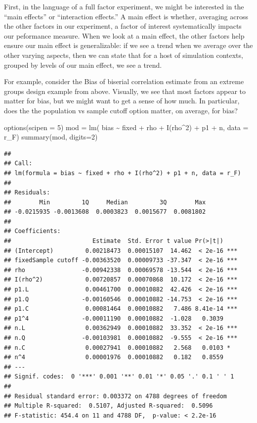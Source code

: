\documentclass[
]{book}
\newenvironment{Shaded}{\begin{snugshade}}{\end{snugshade}}
\newcommand{\AttributeTok}[1]{\textcolor[rgb]{0.77,0.63,0.00}{#1}}
\newcommand{\DecValTok}[1]{\textcolor[rgb]{0.00,0.00,0.81}{#1}}
\newcommand{\FunctionTok}[1]{\textcolor[rgb]{0.00,0.00,0.00}{#1}}
\newcommand{\NormalTok}[1]{#1}
\newcommand{\OtherTok}[1]{\textcolor[rgb]{0.56,0.35,0.01}{#1}}
\newcommand{\SpecialCharTok}[1]{\textcolor[rgb]{0.00,0.00,0.00}{#1}}
\begin{document}
First, in the language of a full factor experiment, we might be interested in the ``main effects'' or ``interaction effects.''
A main effect is whether, averaging across the other factors in our experiment, a factor of interest systematically impacts our peformance measure.
When we look at a main effect, the other factors help ensure our main effect is generalizable: if we see a trend when we average over the other varying aspects, then we can state that for a host of simulation contexts, grouped by levels of our main effect, we see a trend.

For example, consider the Bias of biserial correlation estimate from an extreme groups design example from above.
Visually, we see that most factors appear to matter for bias, but we might want to get a sense of how much.
In particular, does the the population vs sample cutoff option matter, on average, for bias?

\begin{Shaded}
\begin{Highlighting}[]
\FunctionTok{options}\NormalTok{(}\AttributeTok{scipen =} \DecValTok{5}\NormalTok{)}
\NormalTok{mod }\OtherTok{=} \FunctionTok{lm}\NormalTok{( bias }\SpecialCharTok{\textasciitilde{}}\NormalTok{ fixed }\SpecialCharTok{+}\NormalTok{ rho }\SpecialCharTok{+} \FunctionTok{I}\NormalTok{(rho}\SpecialCharTok{\^{}}\DecValTok{2}\NormalTok{) }\SpecialCharTok{+}\NormalTok{ p1 }\SpecialCharTok{+}\NormalTok{ n, }\AttributeTok{data =}\NormalTok{ r\_F)}
\FunctionTok{summary}\NormalTok{(mod, }\AttributeTok{digits=}\DecValTok{2}\NormalTok{)}
\end{Highlighting}
\end{Shaded}

\begin{verbatim}
## 
## Call:
## lm(formula = bias ~ fixed + rho + I(rho^2) + p1 + n, data = r_F)
## 
## Residuals:
##        Min         1Q     Median         3Q        Max 
## -0.0215935 -0.0013608  0.0003823  0.0015677  0.0081802 
## 
## Coefficients:
##                       Estimate  Std. Error t value Pr(>|t|)    
## (Intercept)         0.00218473  0.00015107  14.462  < 2e-16 ***
## fixedSample cutoff -0.00363520  0.00009733 -37.347  < 2e-16 ***
## rho                -0.00942338  0.00069578 -13.544  < 2e-16 ***
## I(rho^2)            0.00720857  0.00070868  10.172  < 2e-16 ***
## p1.L                0.00461700  0.00010882  42.426  < 2e-16 ***
## p1.Q               -0.00160546  0.00010882 -14.753  < 2e-16 ***
## p1.C                0.00081464  0.00010882   7.486 8.41e-14 ***
## p1^4               -0.00011190  0.00010882  -1.028   0.3039    
## n.L                 0.00362949  0.00010882  33.352  < 2e-16 ***
## n.Q                -0.00103981  0.00010882  -9.555  < 2e-16 ***
## n.C                 0.00027941  0.00010882   2.568   0.0103 *  
## n^4                 0.00001976  0.00010882   0.182   0.8559    
## ---
## Signif. codes:  0 '***' 0.001 '**' 0.01 '*' 0.05 '.' 0.1 ' ' 1
## 
## Residual standard error: 0.003372 on 4788 degrees of freedom
## Multiple R-squared:  0.5107, Adjusted R-squared:  0.5096 
## F-statistic: 454.4 on 11 and 4788 DF,  p-value: < 2.2e-16
\end{verbatim}
\end{document}
